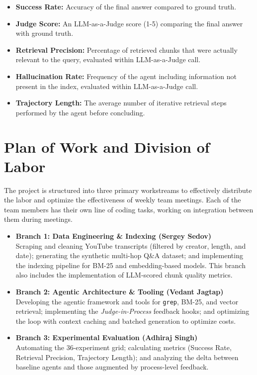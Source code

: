 \documentclass[11pt]{article}
\begin{document}
\begin{itemize}
\item \textbf{Success Rate:} Accuracy of the final answer compared to ground truth.
\item \textbf{Judge Score:} An LLM-as-a-Judge score (1-5) comparing the final answer with ground truth.
\item \textbf{Retrieval Precision:} Percentage of retrieved chunks that were actually relevant to the query, evaluated within LLM-as-a-Judge call.
\item \textbf{Hallucination Rate:} Frequency of the agent including information not present in the index, evaluated within LLM-as-a-Judge call. 
\item \textbf{Trajectory Length:} The average number of iterative retrieval steps performed by the agent before concluding.
\end{itemize}


\section{Plan of Work and Division of Labor}

The project is structured into three primary workstreams to effectively distribute the labor and optimize the effectiveness of weekly team meetings. Each of the team members has their own line of coding tasks, working on integration between them during meetings.
\begin{itemize}
    \item \textbf{Branch 1: Data Engineering \& Indexing (Sergey Sedov)} \\
    Scraping and cleaning YouTube transcripts (filtered by creator, length, and date); generating the synthetic multi-hop Q\&A dataset; and implementing the indexing pipeline for BM-25 and embedding-based models. This branch also includes the implementation of LLM-scored chunk quality metrics.
    
    \item \textbf{Branch 2: Agentic Architecture \& Tooling (Vedant Jagtap)} \\
    Developing the agentic framework and tools for \texttt{grep}, BM-25, and vector retrieval; implementing the \textit{Judge-in-Process} feedback hooks; and optimizing the loop with context caching and batched generation to optimize costs.
    
    \item \textbf{Branch 3: Experimental Evaluation (Adhiraj Singh)} \\
    Automating the 36-experiment grid; calculating metrics (Success Rate, Retrieval Precision, Trajectory Length); and analyzing the delta between baseline agents and those augmented by process-level feedback.
\end{itemize}
\end{document}
